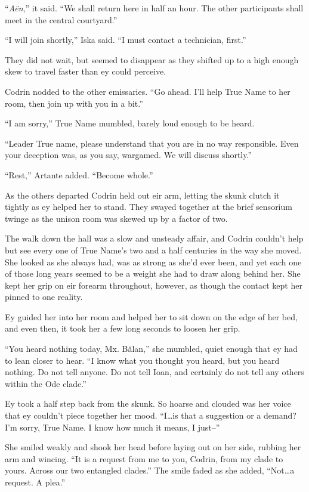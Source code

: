 ``\emph{Aën},'' it said. ``We shall return here in half an hour. The other participants shall meet in the central courtyard.''

``I will join shortly,'' Iska said. ``I must contact a technician, first.''

They did not wait, but seemed to disappear as they shifted up to a high enough skew to travel faster than ey could perceive.

Codrin nodded to the other emissaries. ``Go ahead. I'll help True Name to her room, then join up with you in a bit.''

``I am sorry,'' True Name mumbled, barely loud enough to be heard.

``Leader True name, please understand that you are in no way responsible. Even your deception was, as you say, wargamed. We will discuss shortly.''

``Rest,'' Artante added. ``Become whole.''

As the others departed Codrin held out eir arm, letting the skunk clutch it tightly as ey helped her to stand. They swayed together at the brief sensorium twinge as the unison room was skewed up by a factor of two.

The walk down the hall was a slow and unsteady affair, and Codrin couldn't help but see every one of True Name's two and a half centuries in the way she moved. She looked as she always had, was as strong as she'd ever been, and yet each one of those long years seemed to be a weight she had to draw along behind her. She kept her grip on eir forearm throughout, however, as though the contact kept her pinned to one reality.

Ey guided her into her room and helped her to sit down on the edge of her bed, and even then, it took her a few long seconds to loosen her grip.

``You heard nothing today, Mx. Bălan,'' she mumbled, quiet enough that ey had to lean closer to hear. ``I know what you thought you heard, but you heard nothing. Do not tell anyone. Do not tell Ioan, and certainly do not tell any others within the Ode clade.''

Ey took a half step back from the skunk. So hoarse and clouded was her voice that ey couldn't piece together her mood. ``I\ldots is that a suggestion or a demand? I'm sorry, True Name. I know how much it means, I just--''

She smiled weakly and shook her head before laying out on her side, rubbing her arm and wincing. ``It is a request from me to you, Codrin, from my clade to yours. Across our two entangled clades.'' The smile faded as she added, ``Not\ldots a request. A plea.''

